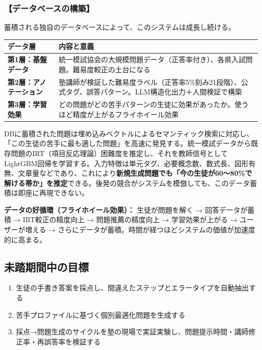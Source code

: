 \documentclass[paper=a4,fontsize=10.5bp,jafontsize=10.5bp,twocolumn]{jlreq}
\begin{document}
\subsubsection{【データベースの構築】}

蓄積される独自のデータベースによって、このシステムは成長し続ける。

\begin{scriptsize}\noindent
\begin{tabularx}{\linewidth}{>{\bfseries}l X}
\toprule
データ層 & 内容と意義 \\
\midrule
第1層：基盤データ & 統一模試協会の大規模問題データ（正答率付き）、各県入試問題。難易度較正の土台になる \\
第2層：アノテーション & 塾講師が検証した難易度ラベル（正答率5\%刻み21段階）、公式タグ、誤答パターン。LLM構造化出力＋人間検証で構築 \\
第3層：学習効果 & どの問題がどの苦手パターンの生徒に効果があったか。使うほど精度が上がるフライホイール効果 \\
\bottomrule
\end{tabularx}
\end{scriptsize}

DBに蓄積された問題は埋め込みベクトルによるセマンティック検索に対応し、「この生徒の苦手に最も適した問題」を高速に発見する。統一模試データから既存問題のIRT（項目反応理論）困難度を推定し、それを教師信号としてLightGBM回帰を学習する。入力特徴は単元タグ、必要概念数、数式長、図形有無、文章量などであり、これにより\textbf{新規生成問題でも「今の生徒が60〜80\%で解ける帯か」を推定}できる。後発の競合がシステムを模倣しても、このデータ蓄積は即座に再現できない。

\begin{graybox}
\textbf{データの好循環（フライホイール効果）：}
生徒が問題を解く → 回答データが蓄積 → IRT較正の精度向上 → 問題推薦の精度向上 → 学習効果が上がる → ユーザーが増える → さらにデータが蓄積。時間が経つほどシステムの価値が加速度的に高まる。
\end{graybox}

\subsection{未踏期間中の目標}

\begin{enumerate}[leftmargin=2em]
  \item 生徒の手書き答案を採点し、間違えたステップとエラータイプを自動抽出する
  \item 苦手プロファイルに基づく個別最適化問題を生成する
  \item 採点→問題生成のサイクルを塾の現場で実証実験し、問題提示時間・講師修正率・再誤答率を検証する
\end{enumerate}
\end{document}
